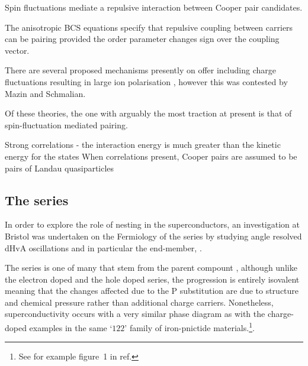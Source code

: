Spin fluctuations mediate a repulsive interaction between Cooper pair candidates.

The anisotropic BCS equations specify that repulsive coupling between carriers can be pairing provided the order parameter changes sign over the coupling vector.


There are several proposed mechanisms presently on offer including charge fluctuations resulting in large ion polarisation \cite{Berciu2009}, however this was contested by Mazin and Schmalian\cite{Mazin2009}.


Of these theories, the one with arguably the most traction at present is that of spin-fluctuation mediated pairing. 


Strong correlations - the interaction energy is much greater than the kinetic energy for the states
When correlations present, Cooper pairs are assumed to be pairs of Landau quasiparticles



\subsection{The \BaFePAs series}

In order to explore the role of nesting in the \highTc superconductors, an investigation at Bristol was undertaken on the Fermiology of the \BaFePAs series by studying angle resolved \ac{dHvA} oscillations and in particular the end-member, \BaFeP.

The \BaFePAs series is one of many that stem from the parent compount \BaFeAs, although unlike the electron doped \BaCoFeAs and the hole doped \BaKFeAs series, the \BaFePAs progression is entirely isovalent meaning that the changes affected due to the P substitution are due to structure and chemical pressure rather than additional charge carriers. Nonetheless, superconductivity occurs with a very similar phase diagram as with the charge-doped examples in the same `$122$' family of iron-pnictide materials.\footnote{See for example figure~1 in ref.\cite{Paglione2010}}. 

